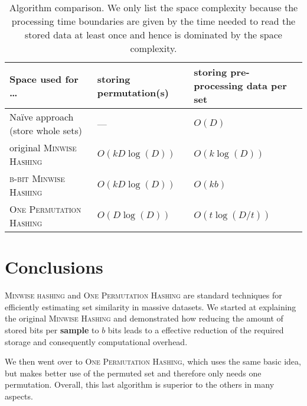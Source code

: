 \documentclass[a4paper]{article}
\begin{document}
\begin{table}[h]
{
\begin{tabulary}{1\textwidth}{LLL}
\hline \textbf{Space used for \ldots}
& storing permutation(s) & storing pre-processing data per set \\
\hline Na\"{i}ve approach (store whole sets) & --- & $O(D)$ \\
\hline original \textsc{Minwise Hashing} & $O(kD\log(D))$ & $O(k\log(D))$ \\
\hline \textsc{b-bit Minwise Hashing} & $O(kD\log(D))$ & $O(kb)$ \\
\hline \textsc{One Permutation Hashing} & $O(D\log(D))$ & $O(t \log(D/t))$ \\
\hline
\end{tabulary}
}
\caption{Algorithm comparison. We only list the space complexity because the processing time boundaries are given by the time needed to read the stored data at least once and hence is dominated by the space complexity.}
\label{table:comparison}
\end{table}


\section{Conclusions}

\textsc{Minwise hashing} and \textsc{One Permutation Hashing} are standard techniques for efficiently estimating set similarity in massive datasets. We started at explaining the original \textsc{Minwise Hashing} and demonstrated how reducing the amount of stored bits per \textbf{sample} to $b$ bits leads to a effective reduction of the required storage and consequently computational overhead.

We then went over to \textsc{One Permutation Hashing}, which uses the same basic idea, but makes better use of the permuted set and therefore only needs one permutation. Overall, this last algorithm is superior to the others in many aspects.



\end{document}
